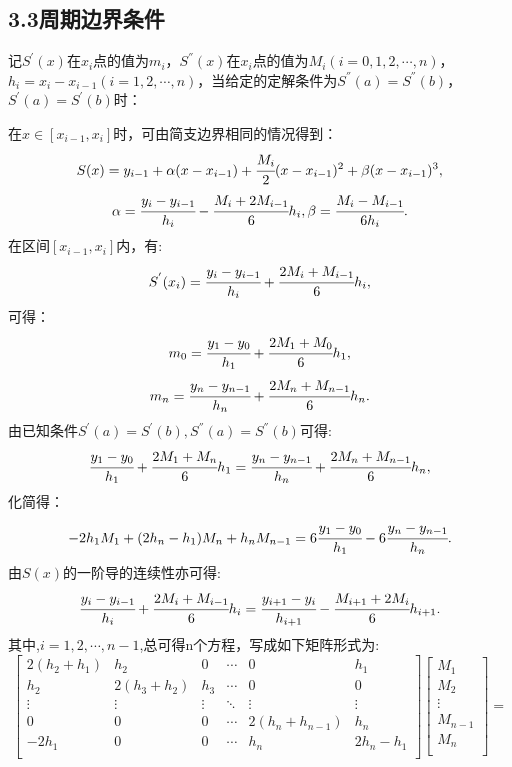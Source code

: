 \documentclass[12pt]{article}
\begin{document}
\subsection*{{\normalsize 3.3}\quad\normalsize\heiti 周期边界条件}

记$S^{'}(x)$在$x_{i}$点的值为$m_{i}$，$S^{''}(x)$在$x_{i}$点的值为$M_{i}(i=0,1,2,\cdots,n)$，$h_{i}=x_{i}-x_{i-1}(i=1,2,\cdots,n)$，当给定的定解条件为$S^{''}(a)=S^{''}(b)$，$S^{'}(a)=S^{'}(b)$时：
\par 在$x\in[x_{i-1},x_{i}]$时，可由简支边界相同的情况得到：
$$S(x)=y_{i-1}+\alpha(x-x_{i-1})+\cfrac{M_{i}}{2}(x-x_{i-1})^{2}+\beta(x-x_{i-1})^{3},$$
$$
\alpha=\cfrac{y_{i}-y_{i-1}}{h_{i}}-\cfrac{M_{i}+2M_{i-1}}{6}h_{i}, \beta=\cfrac{M_{i}-M_{i-1}}{6h_{i}}.
$$
在区间$[x_{i-1},x_{i}]$内，有:
$$S^{'}(x_{i})=\cfrac{y_{i}-y_{i-1}}{h_{i}}+\cfrac{2M_{i}+M_{i-1}}{6}h_{i},$$
可得：
$$m_{0}=\cfrac{y_{1}-y_{0}}{h_{1}}+\cfrac{2M_{1}+M_{0}}{6}h_{1},$$
$$m_{n}=\cfrac{y_{n}-y_{n-1}}{h_{n}}+\cfrac{2M_{n}+M_{n-1}}{6}h_{n}.$$
由已知条件$S^{'}(a)=S^{'}(b),S^{''}(a)=S^{''}(b)$可得:
$$\cfrac{y_{1}-y_{0}}{h_{1}}+\cfrac{2M_{1}+M_{n}}{6}h_{1}=\cfrac{y_{n}-y_{n-1}}{h_{n}}+\cfrac{2M_{n}+M_{n-1}}{6}h_{n},$$
化简得：
\begin{equation}\label{8}
-2h_{1}M_{1}+(2h_{n}-h_{1})M_{n}+h_{n}M_{n-1}=6\cfrac{y_{1}-y_{0}}{h_{1}}-6\cfrac{y_{n}-y_{n-1}}{h_{n}}.
\end{equation}
由$S(x)$的一阶导的连续性亦可得:
\begin{equation}\label{9}
\cfrac{y_{i}-y_{i-1}}{h_{i}}+\cfrac{2M_{i}+M_{i-1}}{6}h_{i}=\cfrac{y_{i+1}-y_{i}}{h_{i+1}}-\cfrac{M_{i+1}+2M_{i}}{6}h_{i+1}.
\end{equation}
其中,$i=1,2,\cdots,n-1$,总可得n个方程，写成如下矩阵形式为:
$$
\left[ \begin{matrix}
2(h_{2}+h_{1}) & h_{2} & 0 & \cdots & 0 & h_{1}\\
h_{2} & 2(h_{3}+h_{2}) & h_{3} & \cdots & 0 & 0\\
\vdots & \vdots & \vdots & \ddots &\vdots &\vdots\\
0 & 0 & 0 &\cdots & 2(h_{n}+h_{n-1}) & h_{n}\\
-2h_{1} & 0 & 0 & \cdots & h_{n} & 2h_{n}-h_{1}\\
\end{matrix} \right]
\left[ \begin{matrix}
M_{1} \\
M_{2} \\
\vdots \\
M_{n-1} \\
M_{n} \\
\end{matrix} \right]
=$$
\end{document}
